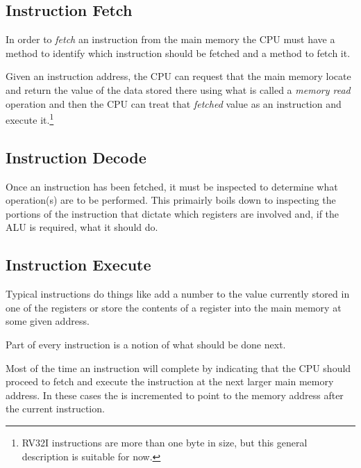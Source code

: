 \subsection{Instruction Fetch}

In order to {\em fetch} an instruction from the main memory the CPU
must have a method to identify which instruction should be fetched and
a method to fetch it. 


Given an instruction address, the CPU can request that the main memory 
locate and return the value of the data stored there using what is called 
a {\em memory read} operation and then the CPU can treat that {\em fetched}
value as an instruction and execute it.\footnote{RV32I instructions are 
more than one byte in size, but this general description is suitable for now.}


\subsection{Instruction Decode}

Once an instruction has been fetched, it must be inspected to determine what
operation(s) are to be performed.  This primairly boils down to inspecting
the portions of the instruction that dictate which registers are involved
and, if the ALU is required, what it should do.


\subsection{Instruction Execute}

Typical instructions do things like add a number to the value
currently stored in one of the registers or store the contents of a
register into the main memory at some given address.

Part of every instruction is a notion of what should be done next.

Most of the time an instruction will complete by indicating that
the CPU should proceed to fetch and execute the instruction at the next
larger main memory address.  In these cases the  is incremented
to point to the memory address after the current instruction.

